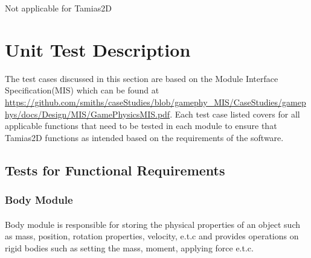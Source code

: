 \documentclass[12pt, titlepage]{article}
\newcommand{\progname}{Tamias2D}
\begin{document}
Not applicable for \progname


\section{Unit Test Description}

The test cases discussed in this section are based on the Module Interface
Specification(MIS) which can be found at
\url{https://github.com/smiths/caseStudies/blob/gamephy_MIS/CaseStudies/gamephys/docs/Design/MIS/GamePhysicsMIS.pdf}. Each
test case listed covers for all applicable functions that need to be tested in
each module to ensure that \progname{} functions as intended based on the
requirements of the software.
	
\subsection{Tests for Functional Requirements}

\subsubsection{Body Module}
		
\paragraph{}
Body module is responsible for storing the physical properties of an object such
as mass, position, rotation properties, velocity, e.t.c and provides operations
on rigid bodies such as setting the mass, moment, applying force
e.t.c. 
\end{document}
